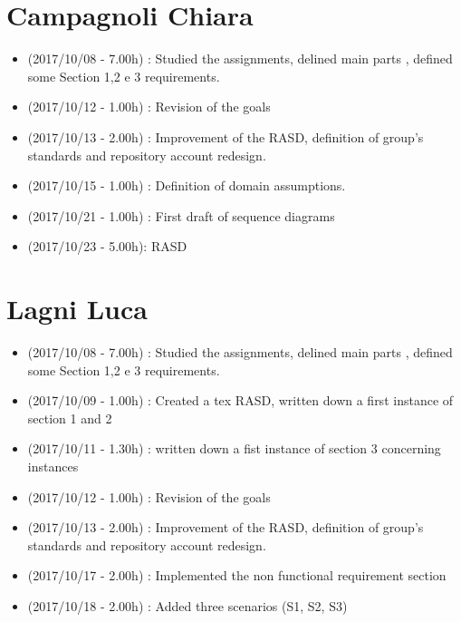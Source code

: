 \documentclass[a4paper,leqno]{book}
\begin{document}
\section{Campagnoli Chiara}
\begin{itemize}
\item (2017/10/08 - 7.00h) : Studied the assignments, delined main parts , defined some Section 1,2 e 3 requirements.
\item (2017/10/12 - 1.00h) : Revision of the goals 
\item (2017/10/13 - 2.00h) : Improvement of the RASD, definition of group's standards and repository account redesign.
\item (2017/10/15 - 1.00h) : Definition of domain assumptions.
\item (2017/10/21 - 1.00h) : First draft of sequence diagrams
\item (2017/10/23 - 5.00h): RASD
\end{itemize}

\section{Lagni Luca}
\begin{itemize}
\item (2017/10/08 - 7.00h) : Studied the assignments, delined main parts , defined some Section 1,2 e 3 requirements.
\item (2017/10/09 - 1.00h) : Created a tex RASD, written down a first instance of section 1 and 2
\item (2017/10/11 - 1.30h) : written down a fist instance of section 3 concerning instances
\item (2017/10/12 - 1.00h) : Revision of the goals 
\item (2017/10/13 - 2.00h) : Improvement of the RASD, definition of group's standards and repository account redesign.
\item (2017/10/17 - 2.00h) : Implemented the non functional requirement section
\item (2017/10/18 - 2.00h) : Added three scenarios (S1, S2, S3)
\end{itemize}
\end{document}
